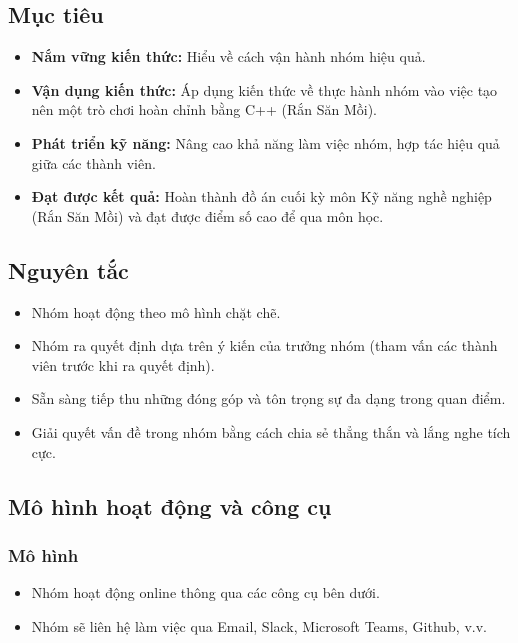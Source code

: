 \documentclass[a4paper,12pt]{article}
\begin{document}
\subsection{Mục tiêu}
\begin{itemize}
    \item \textbf{Nắm vững kiến thức:} Hiểu về cách vận hành nhóm hiệu quả.
    \item \textbf{Vận dụng kiến thức:} Áp dụng kiến thức về thực hành nhóm vào việc tạo nên một trò chơi hoàn chỉnh bằng C++ (Rắn Săn Mồi).
    \item \textbf{Phát triển kỹ năng:} Nâng cao khả năng làm việc nhóm, hợp tác hiệu quả giữa các thành viên.
    \item \textbf{Đạt được kết quả:} Hoàn thành đồ án cuối kỳ môn Kỹ năng nghề nghiệp (Rắn Săn Mồi) và đạt được điểm số cao để qua môn học.
\end{itemize}

\subsection{Nguyên tắc}
\begin{itemize}
    \item Nhóm hoạt động theo mô hình chặt chẽ.
    \item Nhóm ra quyết định dựa trên ý kiến của trưởng nhóm (tham vấn các thành viên trước khi ra quyết định).
    \item Sẵn sàng tiếp thu những đóng góp và tôn trọng sự đa dạng trong quan điểm.
    \item Giải quyết vấn đề trong nhóm bằng cách chia sẻ thẳng thắn và lắng nghe tích cực.
\end{itemize}

\subsection{Mô hình hoạt động và công cụ}

\subsubsection{Mô hình}
\begin{itemize}
    \item Nhóm hoạt động online thông qua các công cụ bên dưới.
    \item Nhóm sẽ liên hệ làm việc qua Email, Slack, Microsoft Teams, Github, v.v.
\end{itemize}

\end{document}
